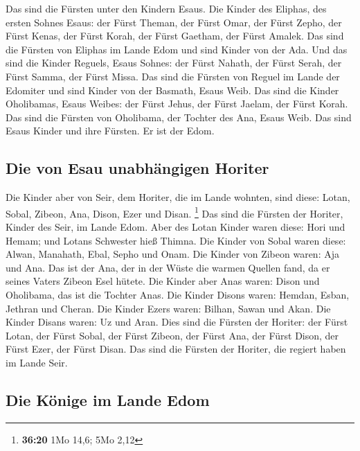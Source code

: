  Das sind die Fürsten unter den Kindern Esaus. Die Kinder
des Eliphas, des ersten Sohnes Esaus: der Fürst Theman, der Fürst Omar,
der Fürst Zepho, der Fürst Kenas,  der Fürst Korah, der
Fürst Gaetham, der Fürst Amalek. Das sind die Fürsten von Eliphas im
Lande Edom und sind Kinder von der Ada.  Und das sind die
Kinder Reguels, Esaus Sohnes: der Fürst Nahath, der Fürst Serah, der
Fürst Samma, der Fürst Missa. Das sind die Fürsten von Reguel im Lande
der Edomiter und sind Kinder von der Basmath, Esaus Weib.
 Das sind die Kinder Oholibamas, Esaus Weibes: der Fürst
Jehus, der Fürst Jaelam, der Fürst Korah. Das sind die Fürsten von
Oholibama, der Tochter des Ana, Esaus Weib.  Das sind
Esaus Kinder und ihre Fürsten. Er ist der Edom.

\hypertarget{die-von-esau-unabhuxe4ngigen-horiter}{%
\subsection{Die von Esau unabhängigen
Horiter}\label{die-von-esau-unabhuxe4ngigen-horiter}}

 Die Kinder aber von Seir, dem Horiter, die im Lande
wohnten, sind diese: Lotan, Sobal, Zibeon, Ana, Dison, Ezer und Disan.
\footnote{\textbf{36:20} 1Mo 14,6; 5Mo 2,12}  Das sind
die Fürsten der Horiter, Kinder des Seir, im Lande Edom. 
Aber des Lotan Kinder waren diese: Hori und Hemam; und Lotans Schwester
hieß Thimna.  Die Kinder von Sobal waren diese: Alwan,
Manahath, Ebal, Sepho und Onam.  Die Kinder von Zibeon
waren: Aja und Ana. Das ist der Ana, der in der Wüste die warmen Quellen
fand, da er seines Vaters Zibeon Esel hütete.  Die Kinder
aber Anas waren: Dison und Oholibama, das ist die Tochter Anas.
 Die Kinder Disons waren: Hemdan, Esban, Jethran und
Cheran.  Die Kinder Ezers waren: Bilhan, Sawan und Akan.
 Die Kinder Disans waren: Uz und Aran. 
Dies sind die Fürsten der Horiter: der Fürst Lotan, der Fürst Sobal, der
Fürst Zibeon, der Fürst Ana,  der Fürst Dison, der Fürst
Ezer, der Fürst Disan. Das sind die Fürsten der Horiter, die regiert
haben im Lande Seir.

\hypertarget{die-kuxf6nige-im-lande-edom}{%
\subsection{Die Könige im Lande
Edom}\label{die-kuxf6nige-im-lande-edom}}

